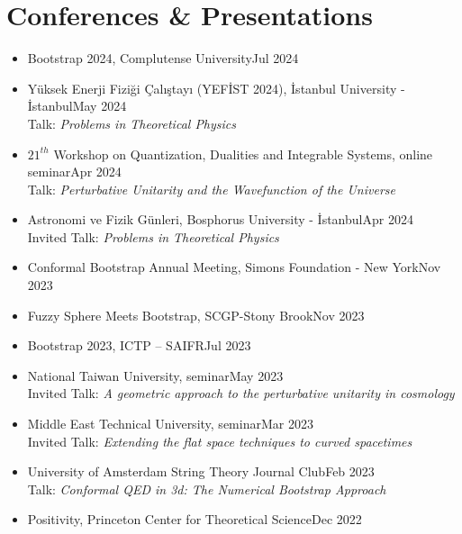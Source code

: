 \documentclass[a4paper,11pt]{article}
\begin{document}
\section{\textcolor{burntorange}{Conferences \& Presentations}}
\begin{itemize}[itemsep=.001em] 
\item[] Bootstrap 2024, Complutense University\hfill Jul 2024
\\
	\item[] Yüksek Enerji Fiziği Çalıştayı (YEFİST 2024), İstanbul University - İstanbul\hfill May 2024
\\
\hspace*{1.8em}Talk: \emph{Problems in Theoretical Physics}
	\item[] $21^{th}$ Workshop on
Quantization, Dualities and Integrable Systems, online seminar\hfill Apr 2024
\\
\hspace*{1.8em}Talk: \emph{Perturbative Unitarity and the Wavefunction of the Universe}
	\item[] Astronomi ve Fizik Günleri, Bosphorus University - İstanbul\hfill Apr 2024
\\
\hspace*{1.8em}Invited Talk: \emph{Problems in Theoretical Physics}
	\item[] Conformal Bootstrap Annual Meeting, Simons Foundation - New York\hfill Nov 2023
	\item[] Fuzzy Sphere Meets Bootstrap, SCGP-Stony Brook\hfill Nov 2023
	\item[] Bootstrap 2023, ICTP – SAIFR\hfill Jul 2023
	\item[] National Taiwan University, seminar\hfill May 2023
\\
\hspace*{1.8em}Invited Talk: \emph{A geometric approach to the perturbative unitarity in cosmology}
	\item[] Middle East Technical University, seminar\hfill Mar 2023
\\
\hspace*{1.8em}Invited Talk: \emph{Extending the flat space techniques to curved spacetimes}
	\item[] University of Amsterdam String Theory Journal Club\hfill Feb 2023
\\
\hspace*{1.8em}Talk: \emph{Conformal QED in 3d: The Numerical Bootstrap Approach}
	\item[] Positivity, Princeton Center for Theoretical Science\hfill Dec 2022

\end{itemize}
\end{document}
